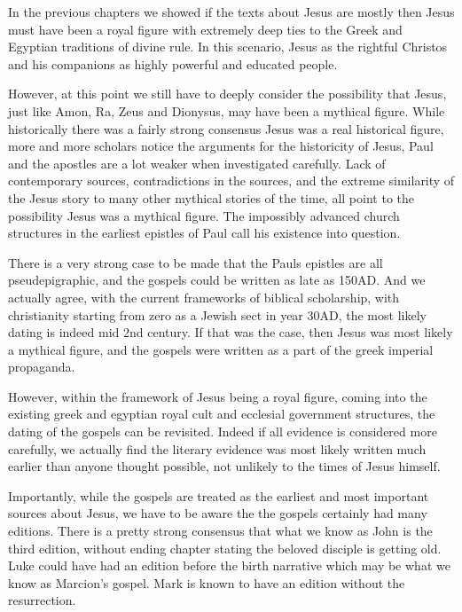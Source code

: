 In the previous chapters we showed if the texts about Jesus are mostly then Jesus must have been a royal figure with extremely deep ties to the Greek and Egyptian traditions of divine rule.
In this scenario, Jesus as the rightful Christos and his companions as highly powerful and educated people.

However, at this point we still have to deeply consider the possibility that Jesus, just like Amon, Ra, Zeus and Dionysus, may have been a mythical figure.
While historically there was a fairly strong consensus Jesus was a real historical figure, more and more scholars notice the arguments for the historicity of Jesus, Paul and the apostles are a lot weaker when investigated carefully.
Lack of contemporary sources, contradictions in the sources, and the extreme similarity of the Jesus story to many other mythical stories of the time, all point to the possibility Jesus was a mythical figure.
The impossibly advanced church structures in the earliest epistles of Paul call his existence into question.

There is a very strong case to be made that the Pauls epistles are all pseudepigraphic, and the gospels could be written as late as 150AD.
And we actually agree, with the current frameworks of biblical scholarship, with christianity starting from zero as a Jewish sect in year 30AD, the most likely dating is indeed mid 2nd century.
If that was the case, then Jesus was most likely a mythical figure, and the gospels were written as a part of the greek imperial propaganda.

However, within the framework of Jesus being a royal figure, coming into the existing greek and egyptian royal cult and ecclesial government structures, the dating of the gospels can be revisited.
Indeed if all evidence is considered more carefully, we actually find the literary evidence was most likely written much earlier than anyone thought possible, not unlikely to the times of Jesus himself.

Importantly, while the gospels are treated as the earliest and most important sources about Jesus, we have to be aware the the gospels certainly had many editions.
There is a pretty strong consensus that what we know as John is the third edition, without ending chapter stating the beloved disciple is getting old.
Luke could have had an edition before the birth narrative which may be what we know as Marcion's gospel.
Mark is known to have an edition without the resurrection.

